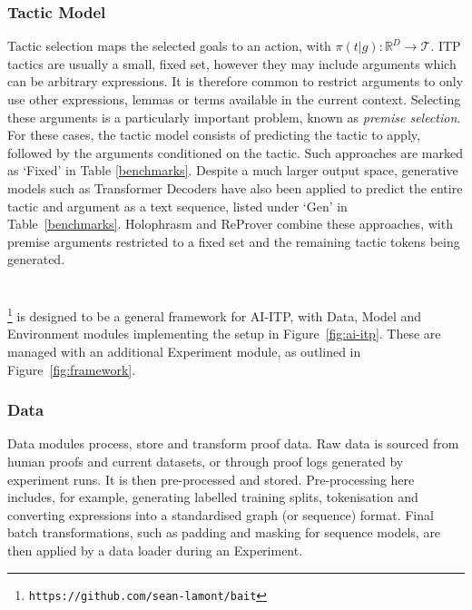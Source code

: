 \documentclass[letterpaper]{article} %
\newcommand{\sysname}{\textsc{\sffamily{Bait}}}
\begin{document}
    \subsubsection{Tactic Model}
    Tactic selection maps the selected goals to an action, with $\pi(t | g) : \mathbb{R}^{D} \to \mathcal{T}$.
    ITP tactics are usually a small, fixed set, however
    they may include arguments which can be arbitrary expressions.
    It is therefore common to restrict arguments to only use other expressions, lemmas or terms available in the current context.
    Selecting these arguments is a particularly important problem, known as \emph{premise selection}.
    For these cases, the tactic model consists of predicting the tactic to apply,
    followed by the arguments conditioned on the tactic. Such approaches are marked as `Fixed' in Table \ref{benchmarks}.
    Despite a much larger output space, generative models such as Transformer Decoders have also
    been applied to predict the entire tactic and argument as a text sequence, listed under `Gen' in Table~\ref{benchmarks}. Holophrasm \cite{whalen_holophrasm_2016} and ReProver \cite{yang_leandojo_2023} combine these approaches, with premise arguments restricted to a fixed set and the remaining tactic tokens being generated.


    \section{\sysname{}}
    \sysname{}\footnote{\texttt{https://github.com/sean-lamont/bait}} is designed to be a general framework for AI-ITP,  with Data, Model and Environment modules implementing the setup in Figure~\ref{fig:ai-itp}. These are managed with an additional Experiment module, as outlined in Figure~\ref{fig:framework}.

    \subsubsection{Data}
    Data modules process, store and transform proof data.
    Raw data is sourced from human proofs and current datasets, or through proof logs generated by experiment runs.
    It is then pre-processed and stored. Pre-processing here includes, for example, generating labelled training splits, tokenisation and converting expressions into a standardised graph (or sequence) format.
    Final batch transformations, such as padding and masking for sequence models, are then applied by a data loader during an Experiment.
\end{document}
